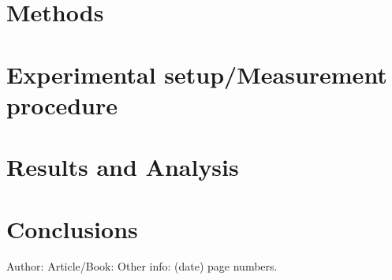 \documentclass{llncs}
\begin{document}
\section{Methods}

\section{Experimental setup/Measurement procedure}

\section{Results and Analysis}

\section{Conclusions}




%
%

\begin{thebibliography}{1}
Author:
Article/Book:
Other info: (date) page numbers.
\end{thebibliography}
\end{document}
